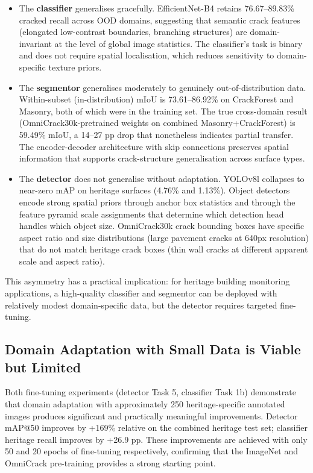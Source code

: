 \documentclass[12pt,a4paper]{article}
\begin{document}
\begin{itemize}[leftmargin=1.5cm]
\item The \textbf{classifier} generalises gracefully. EfficientNet-B4 retains 76.67--89.83\% cracked recall across OOD domains, suggesting that semantic crack features (elongated low-contrast boundaries, branching structures) are domain-invariant at the level of global image statistics. The classifier's task is binary and does not require spatial localisation, which reduces sensitivity to domain-specific texture priors.

\item The \textbf{segmentor} generalises moderately to genuinely out-of-distribution data. Within-subset (in-distribution) mIoU is 73.61--86.92\% on CrackForest and Masonry, both of which were in the training set. The true cross-domain result (OmniCrack30k-pretrained weights on combined Masonry+CrackForest) is 59.49\% mIoU, a 14--27 pp drop that nonetheless indicates partial transfer. The encoder-decoder architecture with skip connections preserves spatial information that supports crack-structure generalisation across surface types.

\item The \textbf{detector} does not generalise without adaptation. YOLOv8l collapses to near-zero mAP on heritage surfaces (4.76\% and 1.13\%). Object detectors encode strong spatial priors through anchor box statistics and through the feature pyramid scale assignments that determine which detection head handles which object size. OmniCrack30k crack bounding boxes have specific aspect ratio and size distributions (large pavement cracks at 640px resolution) that do not match heritage crack boxes (thin wall cracks at different apparent scale and aspect ratio).
\end{itemize}

This asymmetry has a practical implication: for heritage building monitoring applications, a high-quality classifier and segmentor can be deployed with relatively modest domain-specific data, but the detector requires targeted fine-tuning.

\subsection{Domain Adaptation with Small Data is Viable but Limited}

Both fine-tuning experiments (detector Task 5, classifier Task 1b) demonstrate that domain adaptation with approximately 250 heritage-specific annotated images produces significant and practically meaningful improvements. Detector mAP@50 improves by +169\% relative on the combined heritage test set; classifier heritage recall improves by +26.9 pp. These improvements are achieved with only 50 and 20 epochs of fine-tuning respectively, confirming that the ImageNet and OmniCrack pre-training provides a strong starting point.
\end{document}
